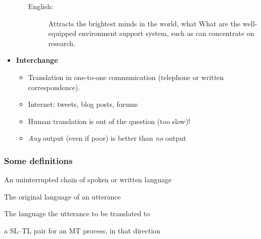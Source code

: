 \begin{frame}[allowframebreaks]
\begin{itemize}
\begin{itemize}
\begin{description}
		\item[English:] Attracts the brightest minds in the world, what What are the well-equipped environment support system, such as can concentrate on research.
		\end{description}
	\end{itemize}
\framebreak
\item \textbf{Interchange}
	\begin{itemize}
	\item Translation in one-to-one communication (telephone or written correspondence).
	\item Internet: tweets, blog posts, forums
	\item Human translation is out of the question (too slow)!
	\item \emph{Any} output (even if poor) is better than \emph{no} output
	\end{itemize}
\end{itemize}
\end{frame}

\begin{frame}
\frametitle{Some definitions}
\begin{description}
\item[Utterance] An uninterrupted chain of spoken or written language
\item[Source language] The original language of an utterance
\item[Target language] The language the utterance to be translated to
\item[Language pair] a SL--TL pair for an MT process, in that direction
\end{description}

\end{frame}


%


